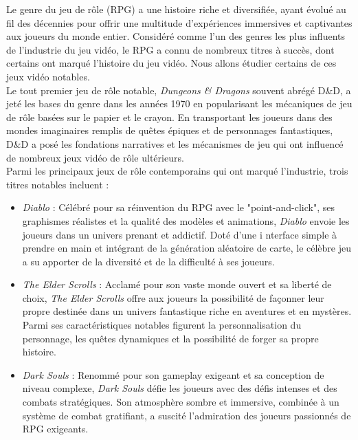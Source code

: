 Le genre du jeu de rôle (RPG) a une histoire riche et diversifiée, ayant évolué au fil des décennies pour offrir une multitude d'expériences immersives et captivantes aux joueurs du monde entier. 
Considéré comme l'un des genres les plus influents de l'industrie du jeu vidéo, le RPG a connu de nombreux titres à succès, dont certains ont marqué l'histoire du jeu vidéo.
Nous allons étudier certains de ces jeux vidéo notables.
\\

Le tout premier jeu de rôle notable, \textit{Dungeons \& Dragons} souvent abrégé D\&D, a jeté les bases du genre dans les années 1970 en popularisant les mécaniques de jeu de rôle basées sur le papier et le crayon.
En transportant les joueurs dans des mondes imaginaires remplis de quêtes épiques et de personnages fantastiques, D\&D a posé les fondations narratives et les mécanismes de jeu qui ont influencé de nombreux jeux vidéo de rôle ultérieurs.
\\

Parmi les principaux jeux de rôle contemporains qui ont marqué l'industrie, trois titres notables incluent :

\vspace{0.2cm}

\begin{itemize}
    \item \textit{Diablo} : Célébré pour sa réinvention du RPG avec le "point-and-click", ses graphismes réalistes et la qualité des modèles et animations, \textit{Diablo} envoie les joueurs dans un univers prenant et addictif.
    Doté d'une i nterface simple à prendre en main et intégrant de la génération aléatoire de carte, le célèbre jeu a su apporter de la diversité et de la difficulté à ses joueurs. \\

    \item \textit{The Elder Scrolls} : Acclamé pour son vaste monde ouvert et sa liberté de choix, \textit{The Elder Scrolls} offre aux joueurs la possibilité de façonner leur propre destinée dans un univers fantastique riche en aventures et en mystères.
    Parmi ses caractéristiques notables figurent la personnalisation du personnage, les quêtes dynamiques et la possibilité de forger sa propre histoire. \\
    
    \item \textit{Dark Souls} : Renommé pour son gameplay exigeant et sa conception de niveau complexe, \textit{Dark Souls} défie les joueurs avec des défis intenses et des combats stratégiques. Son atmosphère sombre et immersive, combinée à un système de combat gratifiant, a suscité l'admiration des joueurs passionnés de RPG exigeants.

\end{itemize} 

